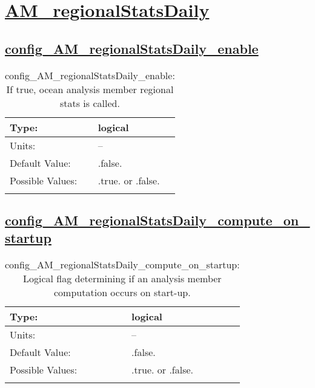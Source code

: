 \section[AM\_regionalStatsDaily]{\hyperref[sec:nm_tab_AM_regionalStatsDaily]{AM\_regionalStatsDaily}}
\label{sec:nm_sec_AM_regionalStatsDaily}
\subsection[config\_AM\_regionalStatsDaily\_enable]{\hyperref[sec:nm_tab_AM_regionalStatsDaily]{config\_AM\_regionalStatsDaily\_enable}}
\label{subsec:nm_sec_config_AM_regionalStatsDaily_enable}
\begin{center}
\begin{longtable}{| p{2.0in} || p{4.0in} |}
    \hline
    Type: & logical \\
    \hline
    Units: & -- \\
    \hline
    Default Value: & .false. \\
    \hline
    Possible Values: & .true. or .false. \\
    \hline
    \caption{config\_AM\_regionalStatsDaily\_enable: If true, ocean analysis member regional stats is called.}
\end{longtable}
\end{center}
\subsection[config\_AM\_regionalStatsDaily\_compute\_on\_startup]{\hyperref[sec:nm_tab_AM_regionalStatsDaily]{config\_AM\_regionalStatsDaily\_compute\_on\_startup}}
\label{subsec:nm_sec_config_AM_regionalStatsDaily_compute_on_startup}
\begin{center}
\begin{longtable}{| p{2.0in} || p{4.0in} |}
    \hline
    Type: & logical \\
    \hline
    Units: & -- \\
    \hline
    Default Value: & .false. \\
    \hline
    Possible Values: & .true. or .false. \\
    \hline
    \caption{config\_AM\_regionalStatsDaily\_compute\_on\_startup: Logical flag determining if an analysis member computation occurs on start-up.}
\end{longtable}
\end{center}
